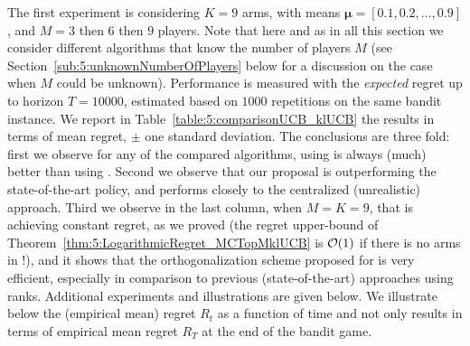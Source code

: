The first experiment is considering $K=9$ arms, with means $\bm{\mu}=[0.1,0.2,\dots,0.9]$, and $M=3$ then $6$ then $9$ players.
Note that here and as in all this section we consider different algorithms that know the number of players $M$ (see Section~\ref{sub:5:unknownNumberOfPlayers} below for a discussion on the case when $M$ could be unknown).
%
Performance is measured with the \emph{expected} regret up to horizon $T=10000$, estimated based on $1000$ repetitions on the same bandit instance.
%
We report in Table~\ref{table:5:comparisonUCB_klUCB} the results in terms of mean regret, $\pm$ one standard deviation.
The conclusions are three fold: first we observe for any of the compared algorithms, using \klUCB{} is always (much) better than using \UCB.
Second we observe that our proposal \MCTopM{} is outperforming the state-of-the-art \RhoRand{} policy, and performs closely to the centralized (unrealistic) approach.
Third we observe in the last column, when $M=K=9$, that \MCTopM{} is achieving constant regret, as we proved (the regret upper-bound of Theorem~\ref{thm:5:LogarithmicRegret_MCTopMklUCB} is $\mathcal{O}(1)$ if there is no arms in \Mworst{} !), and it shows that the orthogonalization scheme proposed for \MCTopM{} is very efficient, especially in comparison to previous (state-of-the-art) approaches using ranks.
%
Additional experiments and illustrations are given below.
We illustrate below the (empirical mean) regret $R_t$ as a function of time and not only results in terms of empirical mean regret $R_T$ at the end of the bandit game.

